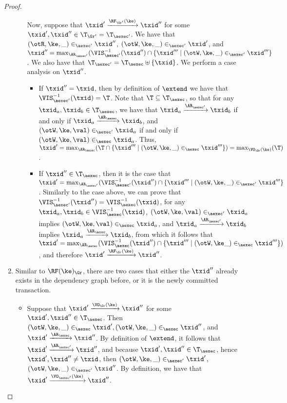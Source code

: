 \begin{proof}
\begin{enumerate}
\begin{itemize}
Now, suppose that $\txid' \xrightarrow{\RF_{\Gr'}(\ke)} \txid''$ for some $\txid', \txid'' \in \T_{\Gr'} = 
\T_{\aexec'}$. We have that $ (\otR, \ke, \_) \in_{\aexec'} \txid''$, 
$(\otW, \ke, \_) \in_{\aexec'} \txid'$, and $\txid'' = \max_{\AR_{\aexec'}}(\VIS_{\aexec'}^{-1}(\txid'') 
\cap \{ \txid''' \mid (\otW, \ke, \_) \in_{\aexec'} \txid'''\}$. 
We also have that $\T_{\aexec'} = \T_{\aexec} \uplus \{\txid\}$. We perform a case 
analysis on $\txid''$. 

\begin{itemize}
\item If $\txid'' = \txid$, then by definition of $\extend$ we have that 
$\VIS^{-1}_{\aexec'}(\txid) = \T$. Note that $\T \subseteq \T_{\aexec}$, so that 
for any $\txid_{a}, \txid_{b} \in \T_{\aexec}$, we have that $\txid_{a} \xrightarrow{\AR_{\aexec'}} \txid_{b}$ 
if and only if $\txid_{a} \xrightarrow{\AR_{\aexec}} \txid_{b}$, 
and $(\otW, \ke, \val) \in_{\aexec'} \txid_{a}$ if and only if $(\otW, \ke, \val) \in_{\aexec} \txid_{a}$. 
Thus, $\txid' = \max_{\AR_{\aexec}}(\T 
\cap \{\txid''' \mid (\otW, \ke, \_) \in_{\aexec} \txid'''\}) = \max_{\VO_{\Gr}(\ke)}(\T)$. 

\item If $\txid'' \in \T_{\aexec}$, then it is the case that 
$\txid' = \max_{\AR_{\aexec'}}(\VIS^{-1}_{\aexec'}(\txid'') \cap \{ \txid''' \mid (\otW, \ke, \_) \in_{\aexec'} \txid'''\}$. 
Similarly to the case above, we can prove that $\VIS^{-1}_{\aexec'}(\txid'') = \VIS^{-1}_{\aexec}(\txid)$, 
for any $\txid_{a}, \txid_{b} \in \VIS^{-1}_{\aexec}(\txid)$, $(\otW, \ke, \val) \in_{\aexec'} \txid_{a}$ 
implies $(\otW, \ke, \val) \in_{\aexec} \txid_{a}$, and $\txid_{a} \xrightarrow{\AR_{\aexec'}} \txid_{b}$ 
implies $\txid_{a} \xrightarrow{\AR_{\aexec}} \txid_{b}$, from which it follows that 
$\txid' = \max_{\AR_{\aexec}}(\VIS^{-1}_{\aexec}(\txid'') \cap \{ \txid''' \mid (\otW, \ke \_) \in_{\aexec} \txid'''\})$, 
and therefore $\txid' \xrightarrow{\RF_{\Gr}(\ke)} \txid''$.
\end{itemize}
\end{itemize}

\item 
Similar to \( \RF(\ke)_{\Gr} \), there are two cases that either the \( \txid'' \) already exists in the dependency graph before,
or it is the newly committed transaction.
\begin{itemize}
\item Suppose that $\txid' \xrightarrow{\VO_{\Gr}(\ke)} \txid''$ for some $\txid', \txid'' \in \T_{\aexec}$. 
Then $(\otW,\ke,\_) \in_{\aexec} \txid', (\otW, \ke, \_) \in_{\aexec} \txid''$, and $\txid' \xrightarrow{\AR_{\aexec}} \txid''$. 
By definition of $\extend$, it follows that $\txid' \xrightarrow{\AR_{\aexec'}} \txid''$, and because 
$\txid', \txid'' \in \T_{\aexec}$, hence $\txid', \txid'' \neq \txid$, then 
$(\otW,\ke, \_) \in_{\aexec'} \txid'$, $(\otW, \ke, \_) \in_{\aexec'} \txid''$. By definition, 
we have that $\txid' \xrightarrow{\VO_{\aexec'}(\ke)} \txid''$.


\end{itemize}
\end{enumerate}
\end{proof}
